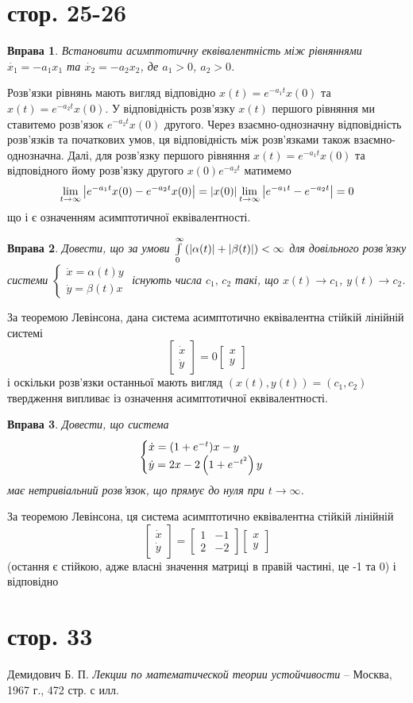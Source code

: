 \documentclass[12pt]{article} %
\newtheorem{prob}{Вправа}
\begin{document}
\section{стор. 25-26}
\begin{prob}Встановити асимптотичну еквівалентність між рівняннями $\dot{x_1}=-a_1x_1$ та $\dot{x_2}=-a_2x_2$, де $a_1>0$, $a_2>0$.
\end{prob}
Розв’язки рівнянь мають вигляд відповідно $x(t)=e^{-a_1t}x(0)$ та $x(t)=e^{-a_2t}x(0)$. У відповідність розв’язку $x(t)$ першого
рівняння ми ставитемо розв'язок $e^{-a_2t}x(0)$ другого. Через взаємно-однозначну відповідність розв’язків та початкових умов, ця
відповідність між розв’язками також взаємно-однозначна. Далі, для розв’язку першого рівняння $x(t)=e^{-a_1t}x(0)$
та відповідного йому розв’язку другого $x(0)e^{-a_2t}$ матимемо
\[\lim_{t\to\infty}\myabs{e^{-a_1t}x(0)-e^{-a_2t}x(0)}=\myabs{x(0)}\lim_{t\to\infty}\myabs{e^{-a_1t}-e^{-a_2t}}=0\]
що і є означенням асимптотичної еквівалентності.
\begin{prob}Довести, що за умови $\int_0^\infty\mybra{\myabs{\alpha(t)}+\myabs{\beta(t)}}<\infty$ для довільного розв’язку системи
$\begin{cases}\dot{x}=\alpha(t)y\\\dot{y}=\beta(t)x\end{cases}$ існують числа $c_1,\,c_2$ такі, що $x(t)\to c_1$, $y(t)\to c_2$.
\end{prob}
За теоремою Левінсона, дана система асимптотично еквівалентна стійкій лінійній системі
\[\begin{bmatrix}\dot{x}\\\dot{y}\end{bmatrix}=0\begin{bmatrix}x\\y\end{bmatrix}\]
і оскільки розв’язки останньої мають вигляд $(x(t),y(t))=(c_1,c_2)$ твердження випливає із означення асимптотичної еквівалентності.
\begin{prob}Довести, що система
\[\begin{cases}\dot{x}=(1+e^{-t})x-y\\\dot{y}=2x-2\left(1+e^{-t^2}\right)y\end{cases}\]
має нетривіальний розв’язок, що прямує до нуля при $t\to\infty$.
\end{prob}
За теоремою Левінсона, ця система асимптотично еквівалентна стійкій лінійній
\[\begin{bmatrix}\dot{x}\\\dot{y}\end{bmatrix}=\begin{bmatrix}1&-1\\2&-2\end{bmatrix}\begin{bmatrix}x\\y\end{bmatrix}\]
(остання є стійкою, адже власні значення матриці в правій частині, це -1 та 0) і відповідно
\section{стор. 33}
\begin{thebibliography}{9}
Демидович Б. П. \emph{Лекции по математической теории устойчивости} --
Москва, 1967 г., 472 стр. с илл.
\end{thebibliography}
\end{document}
